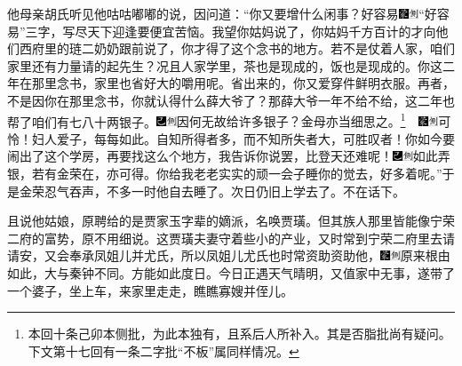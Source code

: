 他母亲胡氏听见他咕咕嘟嘟的说，因问道：“你又要增什么闲事？好容易{\includegraphics[width=3mm]{../Images/00006}\includegraphics[width=3mm]{../Images/00011}\footnotesize \kaishu “好容易”三字，写尽天下迎逢要便宜苦恼。}我望你姑妈说了，你姑妈千方百计的才向他们西府里的琏二奶奶跟前说了，你才得了这个念书的地方。若不是仗着人家，咱们家里还有力量请的起先生？况且人家学里，茶也是现成的，饭也是现成的。你这二年在那里念书，家里也省好大的嚼用呢。省出来的，你又爱穿件鲜明衣服。再者，不是因你在那里念书，你就认得什么薛大爷了？那薛大爷一年不给不给，这二年也帮了咱们有七八十两银子。{\includegraphics[width=3mm]{../Images/00003}\includegraphics[width=3mm]{../Images/00011}\footnotesize \kaishu 因何无故给许多银子？金母亦当细思之。\footnote{本回十条己卯本侧批，为此本独有，且系后人所补入。其是否脂批尚有疑问。下文第十七回有一条二字批“不板”属同样情况。}}{　\includegraphics[width=3mm]{../Images/00006}\includegraphics[width=3mm]{../Images/00011}\footnotesize \kaishu 可怜！妇人爱子，每每如此。自知所得者多，而不知所失者大，可胜叹者！}你如今要闹出了这个学房，再要找这么个地方，我告诉你说罢，比登天还难呢！{\includegraphics[width=3mm]{../Images/00003}\includegraphics[width=3mm]{../Images/00011}\footnotesize \kaishu 如此弄银，若有金荣在，亦可得。}你给我老老实实的顽一会子睡你的觉去，好多着呢。”于是金荣忍气吞声，不多一时他自去睡了。次日仍旧上学去了。不在话下。

且说他姑娘，原聘给的是贾家玉字辈的嫡派，名唤贾璜。但其族人那里皆能像宁荣二府的富势，原不用细说。这贾璜夫妻守着些小的产业，又时常到宁荣二府里去请请安，又会奉承凤姐儿并尤氏，所以凤姐儿尤氏也时常资助资助他，{\includegraphics[width=3mm]{../Images/00006}\includegraphics[width=3mm]{../Images/00011}\footnotesize \kaishu 原来根由如此，大与秦钟不同。}方能如此度日。今日正遇天气晴明，又值家中无事，遂带了一个婆子，坐上车，来家里走走，瞧瞧寡嫂并侄儿。


